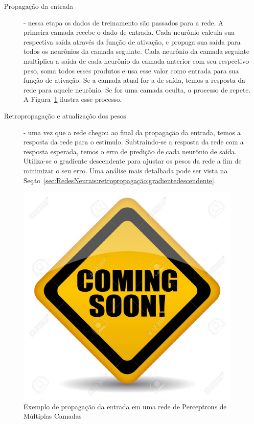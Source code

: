 \begin{description}
	\item[Propagação da entrada] - nessa etapa os dados de treinamento são passados para a rede. A primeira camada recebe o dado de entrada. Cada neurônio calcula sua respectiva saída através da função de ativação, e propaga sua saída para todos os neurônios da camada seguinte. Cada neurônio da camada seguinte multiplica a saída de cada neurônio da camada anterior com seu respectivo peso, soma todos esses produtos e usa esse valor como entrada para sua função de ativação. Se a camada atual for a de saída, temos a resposta da rede para aquele neurônio. Se for uma camada oculta, o processo de repete. A Figura~\ref{fig:propagacaodaentrada} ilustra esse processo.
	\item[Retropropagação e atualização dos pesos] - uma vez que a rede chegou ao final da propagação da entrada, temos a resposta da rede para o estímulo. Subtraindo-se a resposta da rede com a resposta esperada, temos o erro de predição de cada neurônio de saída. Utiliza-se o gradiente descendente para ajustar os pesos da rede a fim de minimizar o seu erro. Uma análise mais detalhada pode ser vista na Seção~\ref{sec:RedesNeurais:retropropagação:gradientedescendente}.
\end{description}

\begin{figure}[h]
\centering
\includegraphics[scale=0.5]{images/cs}
\caption{Exemplo de propagação da entrada em uma rede de Perceptrons de Múltiplas Camadas}
\label{fig:propagacaodaentrada}
\end{figure}

